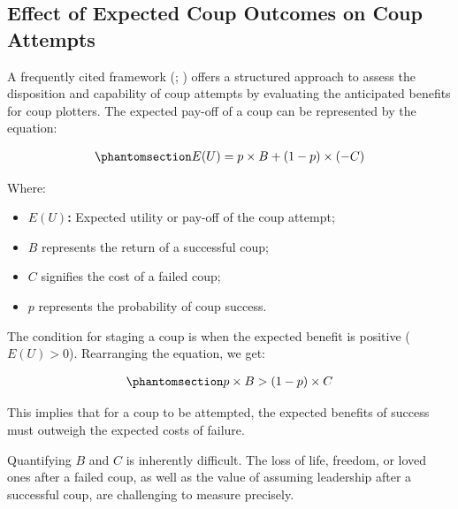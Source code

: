\documentclass[
  12pt,
]{report}
\providecommand{\tightlist}{%
  \setlength{\itemsep}{0pt}\setlength{\parskip}{0pt}}\usepackage{longtable,booktabs,array}
\begin{document}
\subsection{\texorpdfstring{\textbf{Effect of Expected Coup Outcomes on
Coup
Attempts}}{Effect of Expected Coup Outcomes on Coup Attempts}}\label{effect-of-expected-coup-outcomes-on-coup-attempts}

A frequently cited framework (; )
offers a structured approach to assess the disposition and capability of
coup attempts by evaluating the anticipated benefits for coup plotters.
The expected pay-off of a coup can be represented by the equation:

\begin{equation}\phantomsection\label{eq-eq1}{
\begin{aligned}
E(U) = p \times B + (1 - p) \times (-C)
\end{aligned}
}\end{equation}

Where:

\begin{itemize}
\tightlist
\item
  \(E(U)\)\textbf{:} Expected utility or pay-off of the coup attempt;
\item
  \(B\) represents the return of a successful coup;
\item
  \(C\) signifies the cost of a failed coup;
\item
  \(p\) represents the probability of coup success.
\end{itemize}

The condition for staging a coup is when the expected benefit is
positive (\(E(U) > 0\)). Rearranging the equation, we get:

\begin{equation}\phantomsection\label{eq-eq2}{
\begin{aligned}
p \times B > (1 - p) \times C
\end{aligned}
}\end{equation}

This implies that for a coup to be attempted, the expected benefits of
success must outweigh the expected costs of failure.

Quantifying \(B\) and \(C\) is inherently difficult. The loss of life,
freedom, or loved ones after a failed coup, as well as the value of
assuming leadership after a successful coup, are challenging to measure
precisely.
\end{document}
